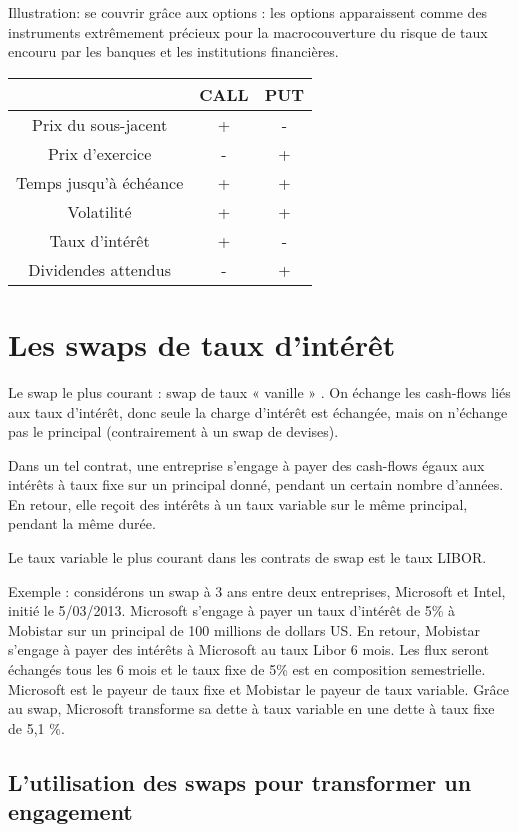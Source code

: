 Illustration: se couvrir grâce aux options : les options apparaissent comme des instruments extrêmement précieux pour la macrocouverture du risque de taux encouru par les banques et les institutions financières.

\begin{tabular}{|c|c|c|}
\hline 
  & CALL & PUT \\ 
\hline 
Prix du sous-jacent & + & - \\ 
\hline 
Prix d'exercice & - & + \\ 
\hline 
Temps jusqu'à échéance & + & + \\ 
\hline 
Volatilité & + & + \\ 
\hline 
Taux d'intérêt & + & - \\ 
\hline 
Dividendes attendus & - & + \\ 
\hline 
\end{tabular} 


\section{Les swaps de taux d'intérêt}

Le swap le plus courant : swap de taux « vanille » . On échange les cash-flows liés aux taux d'intérêt, donc seule la charge d'intérêt est échangée, mais on n'échange pas le principal (contrairement à un swap de devises).

Dans un tel contrat, une entreprise s'engage à payer des cash-flows égaux aux intérêts à taux fixe sur un principal donné, pendant un certain nombre d'années. En retour, elle reçoit des intérêts à un taux variable sur le même principal, pendant la même durée. 

Le taux variable le plus courant dans les contrats de swap est le taux LIBOR. 

Exemple : considérons un swap à 3 ans entre deux entreprises, Microsoft et Intel, initié le 5/03/2013. Microsoft s’engage à payer un taux d'intérêt de 5\% à Mobistar sur un principal de 100 millions de dollars US. En retour, Mobistar s'engage à payer des intérêts à Microsoft au taux Libor 6 mois. Les flux seront échangés tous les 6 mois et le taux fixe de 5\% est en composition semestrielle. Microsoft est le payeur de taux fixe et Mobistar le payeur de taux variable. Grâce au swap, Microsoft transforme sa dette à taux variable en une dette à taux fixe de 5,1 \%.


	\subsection{L'utilisation des swaps pour transformer un engagement}
	
